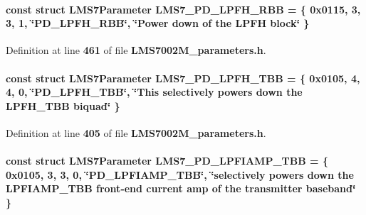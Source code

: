 \paragraph[{L\+M\+S7\+\_\+\+P\+D\+\_\+\+L\+P\+F\+H\+\_\+\+R\+BB}]{\setlength{\rightskip}{0pt plus 5cm}const struct {\bf L\+M\+S7\+Parameter} L\+M\+S7\+\_\+\+P\+D\+\_\+\+L\+P\+F\+H\+\_\+\+R\+BB = \{ 0x0115, 3, 3, 1, \char`\"{}\+P\+D\+\_\+\+L\+P\+F\+H\+\_\+\+R\+B\+B\char`\"{}, \char`\"{}\+Power down of the L\+P\+F\+H block\char`\"{} \}\hspace{0.3cm}{\ttfamily [static]}}\label{LMS7002M__parameters_8h_ad683974e57417e062106eea744ffeb0f}


Definition at line {\bf 461} of file {\bf L\+M\+S7002\+M\+\_\+parameters.\+h}.

\paragraph[{L\+M\+S7\+\_\+\+P\+D\+\_\+\+L\+P\+F\+H\+\_\+\+T\+BB}]{\setlength{\rightskip}{0pt plus 5cm}const struct {\bf L\+M\+S7\+Parameter} L\+M\+S7\+\_\+\+P\+D\+\_\+\+L\+P\+F\+H\+\_\+\+T\+BB = \{ 0x0105, 4, 4, 0, \char`\"{}\+P\+D\+\_\+\+L\+P\+F\+H\+\_\+\+T\+B\+B\char`\"{}, \char`\"{}\+This selectively powers down the L\+P\+F\+H\+\_\+\+T\+B\+B biquad\char`\"{} \}\hspace{0.3cm}{\ttfamily [static]}}\label{LMS7002M__parameters_8h_a5e9141608b668792f18f82a05c76182d}


Definition at line {\bf 405} of file {\bf L\+M\+S7002\+M\+\_\+parameters.\+h}.

\paragraph[{L\+M\+S7\+\_\+\+P\+D\+\_\+\+L\+P\+F\+I\+A\+M\+P\+\_\+\+T\+BB}]{\setlength{\rightskip}{0pt plus 5cm}const struct {\bf L\+M\+S7\+Parameter} L\+M\+S7\+\_\+\+P\+D\+\_\+\+L\+P\+F\+I\+A\+M\+P\+\_\+\+T\+BB = \{ 0x0105, 3, 3, 0, \char`\"{}\+P\+D\+\_\+\+L\+P\+F\+I\+A\+M\+P\+\_\+\+T\+B\+B\char`\"{}, \char`\"{}selectively powers down the L\+P\+F\+I\+A\+M\+P\+\_\+\+T\+B\+B front-\/end current amp of the transmitter baseband\char`\"{} \}\hspace{0.3cm}{\ttfamily [static]}}\label{LMS7002M__parameters_8h_a2add393d8c42a6a415cd8f9f6abc0673}


